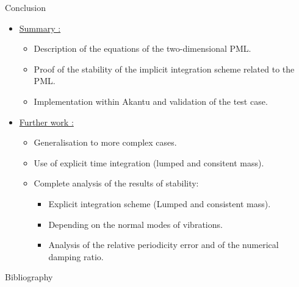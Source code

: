 \begin{frame}{Conclusion}
\begin{itemize}
\item \underline{Summary :}
\begin{itemize}
\item Description of the equations of the two-dimensional PML.
\item Proof of the stability of the implicit integration scheme related to the PML.
\item Implementation within Akantu and validation of the test case.
\end{itemize}
\pause
\item \underline{Further work :}
\begin{itemize}
\item Generalisation to more complex cases.
\item Use of explicit time integration (lumped and consitent mass).
\item Complete analysis of the results of stability:
\begin{itemize}
\item Explicit integration scheme (Lumped and consistent mass).
\item Depending on the normal modes of vibrations.
\item Analysis of the relative periodicity error and of the numerical damping ratio.
\end{itemize} 
\end{itemize} 
\end{itemize}
\end{frame}

\begin{frame}{Bibliography}
    
    
    \end{frame}